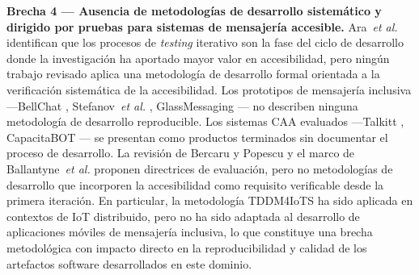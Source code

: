 \documentclass[journal]{IEEEtran}
\begin{document}
	\textbf{Brecha 4 --- Ausencia de metodolog\'ias de desarrollo sistem\'atico y dirigido por pruebas para sistemas de mensajer\'ia accesible.} Ara~\textit{et al.} \cite{ara2024} identifican que los procesos de \textit{testing} iterativo son la fase del ciclo de desarrollo donde la investigaci\'on ha aportado mayor valor en accesibilidad, pero ning\'un trabajo revisado aplica una metodolog\'ia de desarrollo formal orientada a la verificaci\'on sistem\'atica de la accesibilidad. Los prototipos de mensajer\'ia inclusiva ---BellChat \cite{guerrero2021bellchat}, Stefanov~\textit{et al.} \cite{stefanov2024}, GlassMessaging \cite{janaka2023}--- no describen ninguna metodolog\'ia de desarrollo reproducible. Los sistemas CAA evaluados ---Talkitt \cite{costanzo2023}, CapacitaBOT \cite{mateos2022}--- se presentan como productos terminados sin documentar el proceso de desarrollo. La revisi\'on de Bercaru y Popescu \cite{bercaru2024} y el marco de Ballantyne~\textit{et al.} \cite{ballantyne2018} proponen directrices de evaluaci\'on, pero no metodolog\'ias de desarrollo que incorporen la accesibilidad como requisito verificable desde la primera iteraci\'on. En particular, la metodolog\'ia TDDM4IoTS \cite{guerrero2020} ha sido aplicada en contextos de IoT distribuido, pero no ha sido adaptada al desarrollo de aplicaciones m\'oviles de mensajer\'ia inclusiva, lo que constituye una brecha metodol\'ogica con impacto directo en la reproducibilidad y calidad de los artefactos software desarrollados en este dominio.
	
\end{document}
